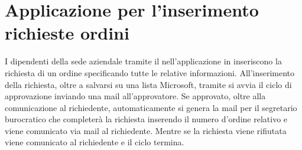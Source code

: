 \section{Applicazione per l'inserimento richieste ordini}
I dipendenti della sede aziendale tramite il  nell’applicazione in  inseriscono la richiesta di un ordine specificando tutte le relative informazioni. 
All’inserimento della richiesta, oltre a salvarsi su una lista Microsoft, tramite  si avvia il ciclo di approvazione inviando una mail all’approvatore. 
Se approvato, oltre alla comunicazione al richiedente, automaticamente si genera la mail per il segretario burocratico che completerà la richiesta inserendo il numero d'ordine relativo e viene comunicato via mail al richiedente. 
Mentre se la richiesta viene rifiutata viene comunicato al richiedente e il ciclo termina.